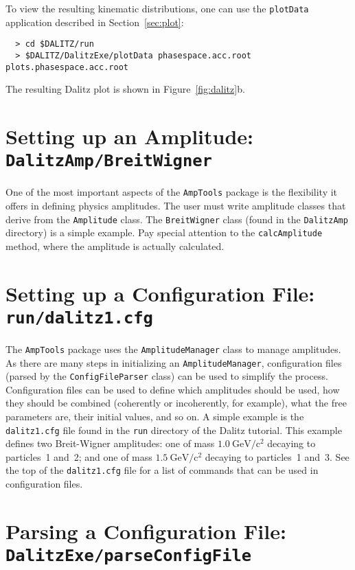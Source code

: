 \documentclass[11pt]{article}
\newcommand{\gevcc}{\mathrm{GeV/c^2}}
\begin{document}
To view the resulting kinematic distributions, one can use the {\tt plotData} application described in Section~\ref{sec:plot}:
\begin{verbatim}
  > cd $DALITZ/run
  > $DALITZ/DalitzExe/plotData phasespace.acc.root plots.phasespace.acc.root
\end{verbatim}
The resulting Dalitz plot is shown in Figure~\ref{fig:dalitz}b.


\section{Setting up an Amplitude: \\
{\tt DalitzAmp/BreitWigner}}
\label{sec:bw}

One of the most important aspects of the {\tt AmpTools} package is the flexibility it offers in defining physics amplitudes.  The user must write amplitude classes that derive from the {\tt Amplitude} class.  The {\tt BreitWigner} class (found in the {\tt DalitzAmp} directory) is a simple example.  Pay special attention to the {\tt calcAmplitude} method, where the amplitude is actually calculated.

\section{Setting up a Configuration File: \\
{\tt run/dalitz1.cfg}}
\label{sec:config}



The {\tt AmpTools} package uses the {\tt AmplitudeManager} class to manage amplitudes.  As there are many steps in initializing an {\tt AmplitudeManager}, configuration files (parsed by the {\tt ConfigFileParser} class) can be used to simplify the process.  Configuration files can be used to define which amplitudes should be used, how they should be combined (coherently or incoherently, for example), what the free parameters are, their initial values, and so on.  A simple example is the {\tt dalitz1.cfg} file found in the {\tt run} directory of the Dalitz tutorial.  This example defines two Breit-Wigner amplitudes: one of mass $1.0~\gevcc$ decaying to particles~1 and~2; and one of mass $1.5~\gevcc$ decaying to particles~1 and~3.  See the top of the {\tt dalitz1.cfg} file for a list of commands that can be used in configuration files.

\section{Parsing a Configuration File: \\
{\tt DalitzExe/parseConfigFile}}
\end{document}
